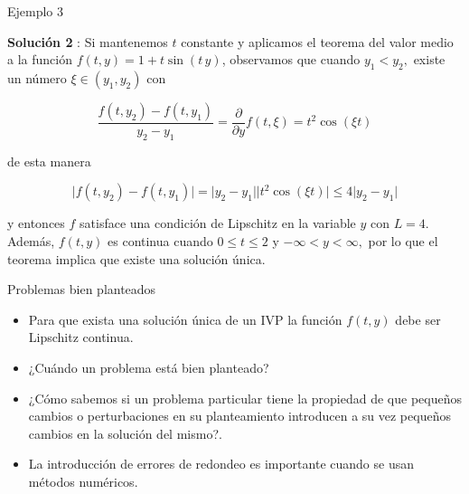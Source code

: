 \documentclass{beamer}
\begin{document}
\begin{frame}{Ejemplo 3}
 
	\textbf{Soluci\'on 2} : Si mantenemos $t$ constante y aplicamos el teorema del valor medio a la funci\'on $f (t, y) = 1 + t \sin (t \, y)$, observamos que cuando $ y_1 < y_2, $ existe un n\'umero $ \xi \in (y_1, y_2) $ con
	
	\begin{displaymath}
		\frac{f (t, y_2) - f (t, y_1)}{y_2 - y_1} = \frac{\partial}{\partial y} f (t, \xi) = t^2 \cos (\xi t)
	\end{displaymath}
	
	de esta manera	
	
	\begin{displaymath}
		\vert f (t, y_2) - f (t, y_1)\vert = \vert y_2 - y_1 \vert \vert t^2 \cos (\xi t) \vert \leq 4 \vert y_2 - y_1 \vert
	\end{displaymath}
	
	y entonces $ f $ satisface una condici\'on de Lipschitz en la variable $y$ con $ L = 4. $ Adem\'as, $ f (t, y) $ es continua cuando $ 0 \leq t \leq 2 $ y $ - \infty < y < \infty, $ por lo que el teorema implica que existe una soluci\'on \'unica. 

\end{frame}

\begin{frame}{Problemas bien planteados}
\begin{itemize}[<+->]
\item Para que exista una solución única de un IVP  la función $f(t,y)$ debe ser Lipschitz continua.
\item ¿Cuándo un problema está bien planteado?
\item ¿Cómo sabemos si un problema particular tiene la propiedad de que pequeños cambios o perturbaciones en su planteamiento introducen a su vez  pequeños cambios en la solución del mismo?.
\item La introducción de errores de redondeo es importante cuando se usan métodos numéricos.
\end{itemize}
\end{frame}
\end{document}
